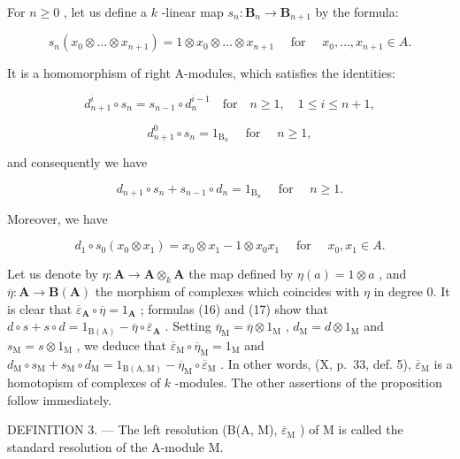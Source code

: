 For \(n \geqslant 0\) , let us define a \(k\) -linear map \(s_n: \mathbf{B}_n \to \mathbf{B}_{n+1}\) by the formula:

\[
s _ {n} \left(x _ {0} \otimes \dots \otimes x _ {n + 1}\right) = 1 \otimes x _ {0} \otimes \dots \otimes x _ {n + 1} \quad \text { for } \quad x _ {0}, \dots , x _ {n + 1} \in A.
\]

It is a homomorphism of right A-modules, which satisfies the identities:

\[
d _ {n + 1} ^ {i} \circ s _ {n} = s _ {n - 1} \circ d _ {n} ^ {i - 1} \quad \mathrm{for} \quad n \geqslant 1, \quad 1 \leqslant i \leqslant n + 1,
\]

\[
d _ {n + 1} ^ {0} \circ s _ {n} = 1 _ {\mathrm{B} _ {n}} \quad \text { for } \quad n \geqslant 1,
\]

and consequently we have

\[
d _ {n + 1} \circ s _ {n} + s _ {n - 1} \circ d _ {n} = 1 _ {\mathrm{B} _ {n}} \quad \text { for } \quad n \geqslant 1.\tag{16}
\]

Moreover, we have

\[
d _ {1} \circ s _ {0} (x _ {0} \otimes x _ {1}) = x _ {0} \otimes x _ {1} - 1 \otimes x _ {0} x _ {1} \quad \text { for } \quad x _ {0}, x _ {1} \in A.\tag{17}
\]

Let us denote by \(\eta: \mathbf{A} \to \mathbf{A} \otimes_k \mathbf{A}\) the map defined by \(\eta(a) = 1 \otimes a\) , and \(\overline{\eta}: \mathbf{A} \to \mathbf{B}(\mathbf{A})\) the morphism of complexes which coincides with \(\eta\) in degree 0. It is clear that \(\overline{\varepsilon}_{\mathbf{A}} \circ \overline{\eta} = 1_{\mathbf{A}}\) ; formulas (16) and (17) show that \(d \circ s + s \circ d = 1_{\mathrm{B(A)}} - \overline{\eta} \circ \overline{\varepsilon}_{\mathbf{A}}\) . Setting \(\overline{\eta}_{\mathrm{M}} = \overline{\eta} \otimes 1_{\mathrm{M}}\) , \(d_{\mathrm{M}} = d \otimes 1_{\mathrm{M}}\) and \(s_{\mathrm{M}} = s \otimes 1_{\mathrm{M}}\) , we deduce that \(\overline{\varepsilon}_{\mathrm{M}} \circ \overline{\eta}_{\mathrm{M}} = 1_{\mathrm{M}}\) and \(d_{\mathrm{M}} \circ s_{\mathrm{M}} + s_{\mathrm{M}} \circ d_{\mathrm{M}} = 1_{\mathrm{B(A,M)}} - \overline{\eta}_{\mathrm{M}} \circ \overline{\varepsilon}_{\mathrm{M}}\) . In other words, (X, p.~33, def. 5), \(\overline{\varepsilon}_{\mathrm{M}}\) is a homotopism of complexes of \(k\) -modules. The other assertions of the proposition follow immediately.

DEFINITION 3. --- The left resolution (B(A, M), \(\overline{\varepsilon}_{\mathrm{M}}\) ) of M is called the standard resolution of the A-module M.

